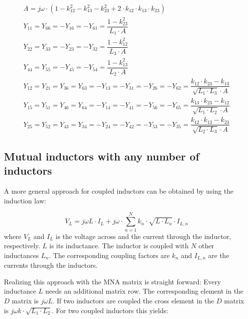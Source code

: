 \begin{gather}
A = j\omega\cdot (1 - k_{12}^2 - k_{13}^2 - k_{23}^2 + 2\cdot k_{12}\cdot k_{13}\cdot k_{23} ) \\
Y_{11} = Y_{66} = -Y_{16} = -Y_{61} = \dfrac{1-k_{23}^2}{L_1\cdot A} \\
Y_{22} = Y_{33} = -Y_{23} = -Y_{32} = \dfrac{1-k_{12}^2}{L_3\cdot A} \\
Y_{44} = Y_{55} = -Y_{45} = -Y_{54} = \dfrac{1-k_{13}^2}{L_2\cdot A} \\
Y_{12} = Y_{21} = Y_{36} = Y_{63} = -Y_{13} = -Y_{31} = -Y_{26} = -Y_{62}
   = \dfrac{k_{12}\cdot k_{23} - k_{13}}{\sqrt{L_1\cdot L_3}\cdot A} \\
Y_{15} = Y_{51} = Y_{46} = Y_{64} = -Y_{14} = -Y_{41} = -Y_{56} = -Y_{65}
   = \dfrac{k_{13}\cdot k_{23} - k_{12}}{\sqrt{L_1\cdot L_2}\cdot A} \\
Y_{25} = Y_{52} = Y_{43} = Y_{34} = -Y_{24} = -Y_{42} = -Y_{53} = -Y_{35}
   = \dfrac{k_{12}\cdot k_{13} - k_{23}}{\sqrt{L_2\cdot L_3}\cdot A}
\end{gather}

\subsection{Mutual inductors with any number of inductors}

A more general approach for coupled inductors can be obtained by
using the induction law:

\begin{equation}
V_L = j\omega L\cdot I_L + j\omega\cdot \sum_{n=1}^N k_n\cdot\sqrt{L\cdot L_n}\cdot I_{L,n}
\end{equation}
where $V_L$ and $I_L$ is the voltage across and the current through
the inductor, respectively.  $L$ is its inductance.  The inductor is
coupled with $N$ other inductances $L_n$.  The corresponding coupling
factors are $k_n$ and $I_{L,n}$ are the currents through the inductors.

\addvspace{12pt}

Realizing this approach with the MNA matrix is straight forward: Every
inductance $L$ needs an additional matrix row.  The corresponding
element in the $D$ matrix is $j\omega L$.  If two inductors are
coupled the cross element in the $D$ matrix is $j\omega
k\cdot\sqrt{L_1\cdot L_2}$.  For two coupled inductors this yields:

